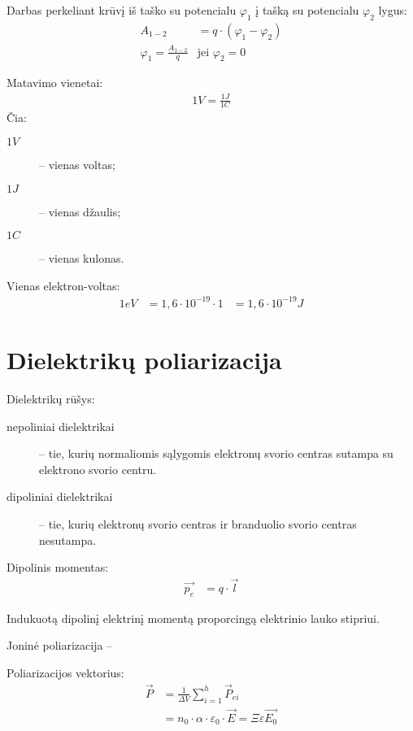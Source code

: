 Darbas perkeliant krūvį iš taško su potencialu $\varphi_{1}$ į tašką
su potencialu $\varphi_{2}$ lygus:
\begin{align*}
  A_{1-2} &= q \cdot (\varphi_{1} - \varphi_{2}) \\
  \varphi_{1} = \frac{A_{1-2}}{q} & \text{jei $\varphi_{2} = 0$}
\end{align*}

Matavimo vienetai:
\begin{align*}
  1 V = \frac{1 J}{1 C}
\end{align*}
Čia:
\begin{description}
  \item[$1 V$] – vienas voltas;
  \item[$1 J$] – vienas džaulis;
  \item[$1 C$] – vienas kulonas.
\end{description}

Vienas elektron-voltas:
\begin{align*}
  1 eV &= 1,6 \cdot 10^{-19} \cdot 1 &= 1,6 \cdot 10^{-19} J
\end{align*}

\section{Dielektrikų poliarizacija}

Dielektrikų rūšys:
\begin{description}
  \item[nepoliniai dielektrikai] – tie, kurių normaliomis sąlygomis
    elektronų svorio centras sutampa su elektrono svorio centru.
  \item[dipoliniai dielektrikai] – tie, kurių elektronų svorio centras
    ir branduolio svorio centras nesutampa.
\end{description}

Dipolinis momentas:
\begin{align*}
  \vec{p_{e}} &= q \cdot \vec{l}
\end{align*}

Indukuotą dipolinį elektrinį momentą proporcingą elektrinio lauko stipriui.

Joninė poliarizacija – 

Poliarizacijos vektorius:
\begin{align*}
  \vec{P}
  &= \frac{1}{\Delta V} \sum _{i=1} ^{h} \vec{P}_{ei} \\
  &= n_{0} \cdot \alpha \cdot \varepsilon_{0} \cdot \vec{E} =
    \Xi \varepsilon \vec{E_{0}}
\end{align*}

